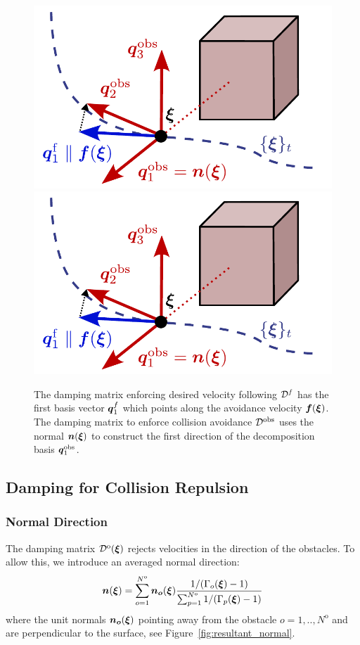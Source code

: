 \begin{figure}
  \center
  \ifthesis
  \includegraphics[width=0.5\columnwidth]{figures/damping_basis_construction.pdf}
  \else
  \includegraphics[width=1\columnwidth]{figures/damping_basis_construction.pdf}
  \fi
\caption{The damping matrix enforcing desired velocity following $\mathcal{D}^{f}$ has the first basis vector $\boldsymbol{q}_1^{f}$ which points along the avoidance velocity $\boldsymbol{f}(\boldsymbol{\xi})$. The damping matrix to enforce collision avoidance $\mathcal{D}^{\mathrm{obs}}$ uses the normal $\boldsymbol{n}(\boldsymbol{\xi})$ to construct the first direction of the decomposition basis $\boldsymbol{q}^{\mathrm{obs}}_1$.}
\label{fig:damping_basis_construction}
\end{figure}

\subsection{Damping for Collision Repulsion} \label{sec:obstacle_repulsion}

\subsubsection{Normal Direction}
The damping matrix $\mathcal{D}^{\mathrm{o}}(\boldsymbol{\xi})$ rejects velocities in the direction of the obstacles. To allow this, we introduce an averaged normal direction:
\begin{equation}
  \vecs n(\vecs\xi) = \sum_{o=1}^{N^{\mathrm{o}}} \vecs{n_o}(\vecs\xi)
  \frac{1 / (\Gamma_o(\vecs \xi) - 1)}{\sum_{p=1}^{N^\mathrm{o}} 1 / (\Gamma_p(\vecs \xi) - 1)}
  \label{eq:averaged_normal}
\end{equation}
 where the unit normals $\boldsymbol{n_o} (\boldsymbol{\xi})$ pointing away from the obstacle $o = 1,  ..,  N^{\mathrm{o}}$ and are perpendicular to the surface, see Figure~\ref{fig:resultant_normal}. 

